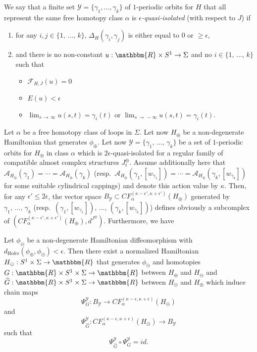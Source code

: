 \documentclass[AHL,Unicode,longabstracts,published]{cedram}
\newcommand{\id}{id}
\newcommand{\R}{\mathbbm{R}}
\newcommand{\hofer}{\mathrm{Hofer}}
\newcommand{\clY}{\mathcal{Y}}
\newcommand{\clA}{\mathcal{A}}
\newcommand{\clF}{\mathcal{F}}
\newcommand*{\alphenumi}{\renewcommand*{\theenumi}{\alph{enumi}}}
\newcommand{\hofer}{\mathrm{Hofer}}
\begin{document}
\begin{defi}\label{defi:quasi-isolation}
We say that a finite set $\clY =\{\gamma_1, \ldots, \gamma_k\}$ of $1$-periodic orbits for $H$ that all represent the same free homotopy class $\alpha$ is \emph{$\epsilon$-quasi-isolated} (with respect to $J$) if
\begin{enumerate}\alphenumi
\item for any $i,j \in \{1,\,\ldots,\, k\}$, $\Delta_H(\gamma_i, \gamma_j)$ is either equal to $0$ or $\geq \epsilon$,
\item and there is no non-constant $u:\R \times S^1 \to \Sigma$ and no $i \in \{1, \,\ldots,\, k\}$ such that
\begin{itemize}
\item $\clF_{H,J}(u) = 0$
\item $E(u) < \epsilon$
\item $\lim_{s\,\to\,\infty}u(s,t) = \gamma_{i}(t)$ or $\lim_{s\,\to\,-\infty}u(s,t) = \gamma_{i}(t)$.
\end{itemize}
\end{enumerate}
\end{defi}

Let $\alpha$ be a free homotopy class of loops in $\Sigma$. Let now $H_{\oplus}$ be a non-degenerate Hamiltonian that generates $\phi_{\oplus}$. Let now $\clY=\{\gamma_1,\,\ldots,\,\gamma_k\}$ be a set of $1$-periodic orbits for $H_{\oplus}$ in class $\alpha$ which is $2\epsilon$-quasi-isolated for a regular family of compatible almost complex structures $J^{\oplus}_t$. Assume additionally here that $\clA_{H_{\oplus}}(\gamma_1)= \cdots = \clA_{H_{\oplus}}(\gamma_k)$ (resp.\ $\clA_{H_{\oplus}}(\gamma_1, [w_{\gamma_1}]) = \cdots = \clA_{H_{\oplus}}(\gamma_k, [w_{\gamma_k}])$ for some suitable cylindrical cappings) and denote this action value by $\kappa$. Then, for any $\epsilon'\leq 2\epsilon$, the vector space $B_{\clY}\subset CF_{\alpha}^{(\kappa-\epsilon', \kappa+\epsilon')}(H_{\oplus})$ generated by $\gamma_1,\,\ldots,\, \gamma_k$ (resp.\ $(\gamma_1,[w_{\gamma_1}]), \,\ldots,\,(\gamma_k,[w_{\gamma_k}])$) defines obviously a subcomplex of $(CF_{\alpha}^{(\kappa-\epsilon', \kappa+\epsilon')}(H_{\oplus}), d^{J^{\oplus}})$. Furthermore, we have

\begin{prop}\label{prop:quasi_iso}
Let $\phi_\ominus$ be a non-degenerate Hamiltonian diffeomorphism with $d_{\hofer}(\phi_\oplus, \phi_\ominus)< \epsilon$. Then there exist a normalized Hamiltonian $H_\ominus: S^1 \times \Sigma \to \R $ that generates $\phi_{\ominus}$ and homotopies $G: \R \times S^1 \times \Sigma \to \R $ between $H_\oplus$ and $H_\ominus$ and $\widehat{G}: \R \times S^1 \times \Sigma \to \R $ between $H_\ominus$ and $H_\oplus$ which induce chain maps
\[
\Psi^{\clY}_G: {B}_{\clY} \to CF_\alpha^{(\kappa-{\epsilon},\kappa+{\epsilon})}(H_\ominus)
\]
and
\[
\Psi^{\clY}_{\widehat{G}}: CF_\alpha^{(\kappa-{\epsilon},\kappa+{\epsilon})}(H_\ominus) \to {B}_{\clY}
\]
such that
\[
\Psi^{\clY}_{\widehat{G}}\circ {\Psi^{\clY}_G} = \id.
\]
\end{prop}
\end{document}
